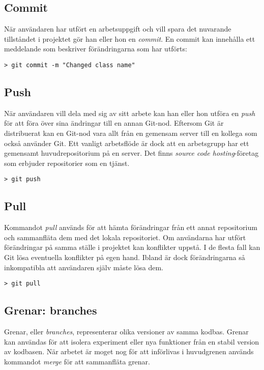 \subsection{Commit}
När användaren har utfört en arbetsuppgift och vill spara det nuvarande tillståndet i projektet gör han eller hon en \emph{commit}. En commit kan innehålla ett meddelande som beskriver förändringarna som har utförts:

\begin{Verbatim}
> git commit -m "Changed class name"
\end{Verbatim}

\subsection{Push}
När användaren vill dela med sig av sitt arbete kan han eller hon utföra en \emph{push} för att föra över sina ändringar till en annan Git-nod. Eftersom Git är distribuerat kan en Git-nod vara allt från en gemensam server till en kollega som också använder Git. Ett vanligt arbetsflöde är dock att en arbetsgrupp har ett gemensamt huvudrepositorium på en server. Det finns \emph{source code hosting}-företag som erbjuder repositorier som en tjänst.
\begin{Verbatim}
> git push
\end{Verbatim}

\subsection{Pull}
Kommandot \emph{pull} används för att hämta förändringar från ett annat repositorium och sammanfläta dem med det lokala repositoriet. Om användarna har utfört förändringar på samma ställe i projektet kan konflikter uppstå. I de flesta fall kan Git lösa eventuella konflikter på egen hand. Ibland är dock förändringarna så inkompatibla att användaren själv måste lösa dem.

\begin{Verbatim}
> git pull
\end{Verbatim}

\subsection{Grenar: branches}
Grenar, eller \emph{branches}, representerar olika versioner av samma kodbas. Grenar kan användas för att isolera experiment eller nya funktioner från en stabil version av kodbasen. När arbetet är moget nog för att införlivas i huvudgrenen används kommandot \emph{merge} för att sammanfläta grenar.

